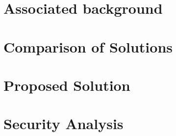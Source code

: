 \documentclass[10pt]{report}
\newif\ifnotesincluded
\begin{document}
\chapter{Associated background} \label{chapterBackground}




\chapter{Comparison of Solutions} \label{chapterComparison}




\chapter{Proposed Solution} \label{chapterTheoreticalSolution}





\chapter{Security Analysis} \label{chapterSecurityAnalysis}



\fi


\ifnotesincluded
\chapter{Practical Implementation} \label{chapterPracticalImplementation}

\chapter{Conclusion and Further Work} \label{chapterConclusion}
\fi

\begin{sloppypar}
\printbibliography
\end{sloppypar}
\end{document}

